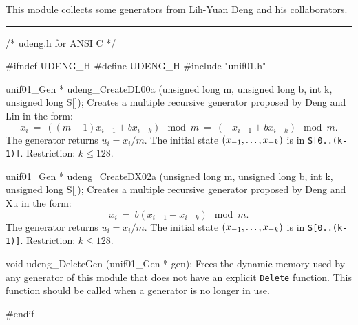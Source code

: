 
This module collects some generators from Lih-Yuan Deng and his
 collaborators.%



\bigskip
\hrule
\code\hide
/* udeng.h for ANSI C */

#ifndef UDENG_H
#define UDENG_H
\endhide
#include "unif01.h"
\endcode
\code


unif01_Gen * udeng_CreateDL00a (unsigned long m, unsigned long b, int k,
                                unsigned long S[]);
\endcode
  \tab Creates a multiple recursive generator proposed by Deng
   and Lin \cite{rDEN00a} in the form:
   $$
     x_i\ =\ ((m-1)x_{i-1} + b x_{i-k}) \mod m\ =\ 
           (-x_{i-1} + b x_{i-k}) \mod m.
   $$
   The generator returns $u_i = x_i/m$. The initial state 
   $(x_{-1},\dots,\?x_{-k})$ is in {\tt S[0..(k-1)]}.
   Restriction: $k \le 128$.
 \endtab
\code


unif01_Gen * udeng_CreateDX02a (unsigned long m, unsigned long b, int k,
                                unsigned long S[]);
\endcode
  \tab Creates a multiple recursive generator proposed by Deng
   and Xu \cite{rDEN02a} in the form:
   $$
     x_i \ =\ b(x_{i-1} + x_{i-k}) \mod m.
   $$
   The generator returns $u_i = x_i/m$. The initial state 
   $(x_{-1},\dots,\?x_{-k})$ is in {\tt S[0..(k-1)]}.
   Restriction: $k \le 128$.
 \endtab






\code


void udeng_DeleteGen (unif01_Gen * gen);
\endcode
  \tab Frees the dynamic memory used by any generator of this module
  that does not have an explicit {\tt Delete} function. 
  This function should be called when a generator
  is no longer in use.
 \endtab

\code
\hide
#endif
\endhide
\endcode
